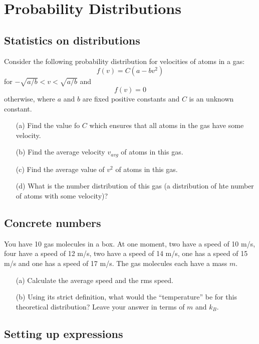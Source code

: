 \documentclass{article}
\begin{document}
\newpage

\section{Probability Distributions}

\subsection{Statistics on distributions}

Consider the following probability distribution for velocities of atoms in a gas:
\begin{equation}
f(v) = C(a-bv^2)
\end{equation}
for $-\sqrt{a/b} < v < \sqrt{a/b}$ and
\begin{equation}
f(v) = 0
\end{equation}
otherwise, where $a$ and $b$ are fixed positive constants and $C$ is an unknown constant.
\begin{itemize}
	\item[(a)] Find the value fo $C$ which ensures that all atoms in the gas have some velocity.
	\item[(b)] Find the average velocity $v_{avg}$ of atoms in this gas.
	\item[(c)] Find the average value of $v^2$ of atoms in this gas.
	\item[(d)] What is the number distribution of this gas (a distribution of hte number of atoms with some velocity)?
\end{itemize}

\subsection{Concrete numbers}

You have 10 gas molecules in a box. At one moment, two have a speed of 10 m/s, four have a speed of 12 m/s, two have a speed of 14 m/s, one has a speed of 15 m/s and one has a speed of 17 m/s. The gas molecules each have a mass $m$.
\begin{itemize}
	\item[(a)] Calculate the average speed and the rms speed.
	\item[(b)] Using its strict definition, what would the ``temperature'' be for this theoretical distribution? Leave your answer in terms of $m$ and $k_B$.
\end{itemize}

\subsection{Setting up expressions}
\end{document}
